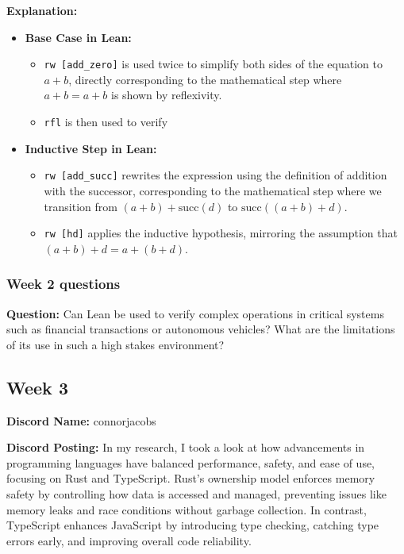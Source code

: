 \documentclass{article}
\theoremstyle{theorem}
\theoremstyle{definition}
\theoremstyle{remark}
\begin{document}
\textbf{Explanation:}

\begin{itemize}
  \item \textbf{Base Case in Lean:}
  \begin{itemize}
      \item \texttt{rw [add\_zero]} is used twice to simplify both sides of the equation to $a + b$, directly corresponding to the mathematical step where $a + b = a + b$ is shown by reflexivity.
      \item \texttt{rfl} is then used to verify
  \end{itemize}

  \item \textbf{Inductive Step in Lean:}
  \begin{itemize}
      \item \texttt{rw [add\_succ]} rewrites the expression using the definition of addition with the successor, corresponding to the mathematical step where we transition from $(a + b) + \text{succ}(d)$ to $\text{succ}((a + b) + d)$.
      \item \texttt{rw [hd]} applies the inductive hypothesis, mirroring the assumption that $(a + b) + d = a + (b + d)$.
  \end{itemize}
\end{itemize}

\subsubsection*{Week 2 questions}

\textbf{Question:} Can Lean be used to verify complex operations in critical systems such as financial transactions or autonomous vehicles? What are the limitations of its use in such a high stakes environment?

\subsection{Week 3}

\textbf{Discord Name:} connorjacobs

\textbf{Discord Posting:} In my research, I took a look at how advancements in programming languages have balanced performance, safety, and ease of use, focusing on Rust and TypeScript. Rust’s ownership model enforces memory safety by controlling how data is accessed and managed, preventing issues like memory leaks and race conditions without garbage collection. In contrast, TypeScript enhances JavaScript by introducing type checking, catching type errors early, and improving overall code reliability.
\end{document}
